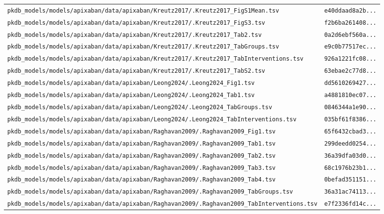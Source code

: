 \begin{longtable}{ll}
\texttt{pkdb\_models/models/apixaban/data/apixaban/Kreutz2017/.Kreutz2017\_FigS1Mean.tsv} & \texttt{e40ddaad8a2b...} \\
\texttt{pkdb\_models/models/apixaban/data/apixaban/Kreutz2017/.Kreutz2017\_FigS3.tsv} & \texttt{f2b6ba261408...} \\
\texttt{pkdb\_models/models/apixaban/data/apixaban/Kreutz2017/.Kreutz2017\_Tab2.tsv} & \texttt{0a2d6ebf560a...} \\
\texttt{pkdb\_models/models/apixaban/data/apixaban/Kreutz2017/.Kreutz2017\_TabGroups.tsv} & \texttt{e9c0b77517ec...} \\
\texttt{pkdb\_models/models/apixaban/data/apixaban/Kreutz2017/.Kreutz2017\_TabInterventions.tsv} & \texttt{926a1221fc08...} \\
\texttt{pkdb\_models/models/apixaban/data/apixaban/Kreutz2017/.Kreutz2017\_TabS2.tsv} & \texttt{63ebae2c77d8...} \\
\texttt{pkdb\_models/models/apixaban/data/apixaban/Leong2024/.Leong2024\_Fig1.tsv} & \texttt{dd5610269427...} \\
\texttt{pkdb\_models/models/apixaban/data/apixaban/Leong2024/.Leong2024\_Tab1.tsv} & \texttt{a4881810ec07...} \\
\texttt{pkdb\_models/models/apixaban/data/apixaban/Leong2024/.Leong2024\_TabGroups.tsv} & \texttt{0846344a1e90...} \\
\texttt{pkdb\_models/models/apixaban/data/apixaban/Leong2024/.Leong2024\_TabInterventions.tsv} & \texttt{035bf61f8386...} \\
\texttt{pkdb\_models/models/apixaban/data/apixaban/Raghavan2009/.Raghavan2009\_Fig1.tsv} & \texttt{65f6432cbad3...} \\
\texttt{pkdb\_models/models/apixaban/data/apixaban/Raghavan2009/.Raghavan2009\_Tab1.tsv} & \texttt{299deedd0254...} \\
\texttt{pkdb\_models/models/apixaban/data/apixaban/Raghavan2009/.Raghavan2009\_Tab2.tsv} & \texttt{36a39dfa03d0...} \\
\texttt{pkdb\_models/models/apixaban/data/apixaban/Raghavan2009/.Raghavan2009\_Tab3.tsv} & \texttt{68c1976b23b1...} \\
\texttt{pkdb\_models/models/apixaban/data/apixaban/Raghavan2009/.Raghavan2009\_Tab4.tsv} & \texttt{0befad351151...} \\
\texttt{pkdb\_models/models/apixaban/data/apixaban/Raghavan2009/.Raghavan2009\_TabGroups.tsv} & \texttt{36a31ac74113...} \\
\texttt{pkdb\_models/models/apixaban/data/apixaban/Raghavan2009/.Raghavan2009\_TabInterventions.tsv} & \texttt{e7f2336fd14c...} \\

\end{longtable}
